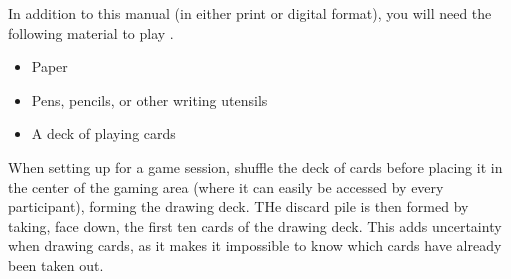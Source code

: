 In addition to this manual (in either print or digital format), you will need the following material to play
\ParadoxSpaceRPG.

\begin{itemize}
\item Paper
\item Pens, pencils, or other writing utensils
\item A deck of playing cards
\end{itemize}

When setting up for a game session, shuffle the deck of cards before placing it in the center of the gaming area
(where it can easily be accessed by every participant), forming the drawing deck. THe discard pile is then formed
by taking, face down, the first ten cards of the drawing deck. This adds uncertainty when drawing cards, as it
makes it impossible to know which cards have already been taken out.
